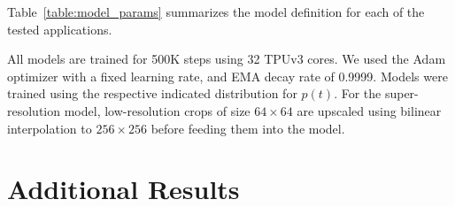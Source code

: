 \documentclass[10pt]{article} %
\begin{document}
Table~\ref{table:model_params} summarizes the model definition for each of the tested applications.



All models are trained for 500K steps using 32 TPUv3 cores. We used the Adam optimizer with a fixed learning rate, and EMA decay rate of 0.9999.  Models were trained using the respective indicated distribution for $p(t)$. For the super-resolution model, low-resolution crops of size $64\times64$ are upscaled using bilinear interpolation to $256\times256$ before feeding them into the model.


\section{Additional Results}
\label{app:more_results}





\clearpage
\end{document}

